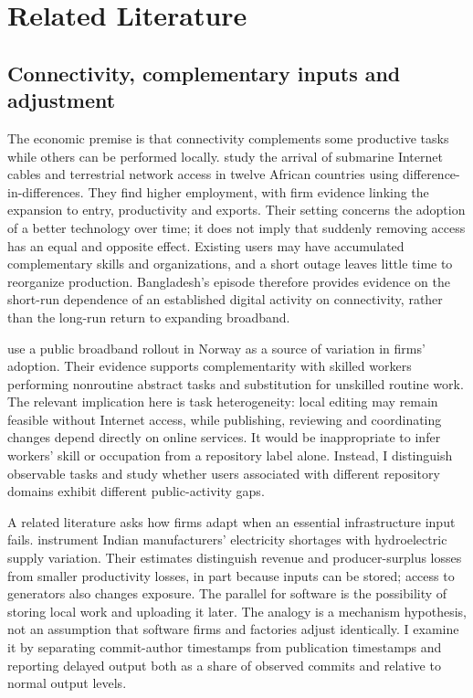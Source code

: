 \section{Related Literature}
\label{sec:literature}

\subsection{Connectivity, complementary inputs and adjustment}

The economic premise is that connectivity complements some productive tasks while others can be performed locally. \citet{hjort2019} study the arrival of submarine Internet cables and terrestrial network access in twelve African countries using difference-in-differences. They find higher employment, with firm evidence linking the expansion to entry, productivity and exports. Their setting concerns the adoption of a better technology over time; it does not imply that suddenly removing access has an equal and opposite effect. Existing users may have accumulated complementary skills and organizations, and a short outage leaves little time to reorganize production. Bangladesh's episode therefore provides evidence on the short-run dependence of an established digital activity on connectivity, rather than the long-run return to expanding broadband.

\citet{akerman2015} use a public broadband rollout in Norway as a source of variation in firms' adoption. Their evidence supports complementarity with skilled workers performing nonroutine abstract tasks and substitution for unskilled routine work. The relevant implication here is task heterogeneity: local editing may remain feasible without Internet access, while publishing, reviewing and coordinating changes depend directly on online services. It would be inappropriate to infer workers' skill or occupation from a repository label alone. Instead, I distinguish observable tasks and study whether users associated with different repository domains exhibit different public-activity gaps.

A related literature asks how firms adapt when an essential infrastructure input fails. \citet{allcott2016} instrument Indian manufacturers' electricity shortages with hydroelectric supply variation. Their estimates distinguish revenue and producer-surplus losses from smaller productivity losses, in part because inputs can be stored; access to generators also changes exposure. The parallel for software is the possibility of storing local work and uploading it later. The analogy is a mechanism hypothesis, not an assumption that software firms and factories adjust identically. I examine it by separating commit-author timestamps from publication timestamps and reporting delayed output both as a share of observed commits and relative to normal output levels.


